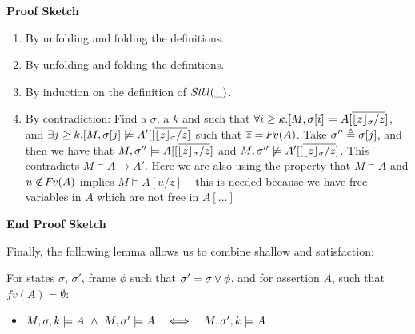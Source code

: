 { 



\noindent
\vspace{.1cm}
{\textbf{Proof Sketch}} 

\begin{enumerate}
\item
By unfolding and folding the definitions.
\item
By unfolding and folding the definitions.
\item
By induction on the definition of ${Stbl( \_ )}$.
\item
By contradiction: Find a $\sigma$, a $k$ and   such that  
$\forall i\geq k.[M,{\sigma[i]} \models A[\overline{ {{\lfloor z \rfloor_{\sigma}}/ z}}]$, and
$\exists j\geq k.[M,{\sigma[j]} \not\models A'[[\overline{ {{\lfloor z \rfloor_{\sigma}}/ z}}]$
 such that $\overline z = {\hspace{-1pt}F\hspace{-1pt}}v(A)$.
 Take $\sigma''\triangleq  \sigma[j]$, and then we have that
 $M, \sigma'' \models A[[\overline{ {{\lfloor z \rfloor_{\sigma}}/ z}}]$ and  $M,  \sigma'' \not\models A'[[\overline{ {{\lfloor z \rfloor_{\sigma}}/ z}}]$.
 This contradicts $ M  \models A \rightarrow A'$.
 Here we are also using the property that $M \models A$  and $u\notin {\hspace{-1pt}F\hspace{-1pt}}v(A)$ implies $M \models A[u/z]$ -- this is needed because we have free variables in $A$ which are not free in $A[...]$ 
 {}
 {}
\end{enumerate}
\noindent
{\textbf{End Proof Sketch}} 

 
 
Finally, the following lemma allows us to combine shallow and \scoped satisfaction:

\begin{lemma}
\label{l:shallow:scoped:scoped}
For states  $\sigma$,  $\sigma'$, frame $\phi$ such that $\sigma'=\sigma  \, {\triangledown}\, \phi$, and for  
assertion $A$, such that $fv(A)=\emptyset$:
\begin{itemize}
\item
$\satDAssertFrom M  \sigma k A\   \wedge \ M, \sigma' \models A \ \ \ \Longleftrightarrow \ \ \   \satDAssertFrom M  {\sigma'} k  A$ 
\end{itemize}
\end{lemma}

}
